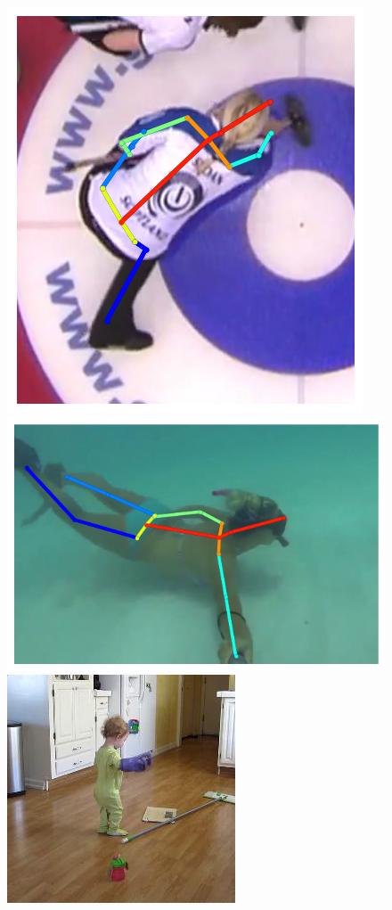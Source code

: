 \begin{figure}[t!]
    \includegraphics[height=\flowh]{resources/Human_Poses/pose/qualitative/pred-12}
    \hfill
    \includegraphics[height=\flowh]{resources/Human_Poses/pose/qualitative/pred-13}
    \\
    \newcommand{\flowhh}{0.27\columnwidth}
    \includegraphics[height=\flowhh]{resources/Human_Poses/pose/qualitative/view/view_img_00}

\end{figure}

